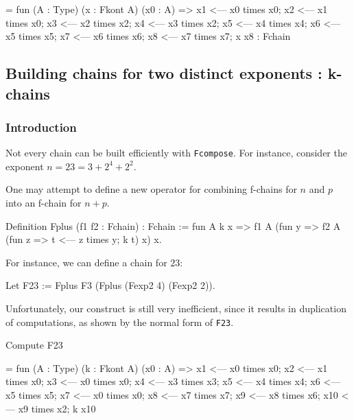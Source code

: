 \begin{Coqanswer}
= fun (A : Type) (x : Fkont A) (x0 : A) =>
       x1 <--- x0 times x0;
       x2 <--- x1 times x0;
       x3 <--- x2 times x2;
       x4 <--- x3 times x2;
       x5 <--- x4 times x4;
       x6 <--- x5 times x5; 
       x7 <--- x6 times x6; 
       x8 <--- x7 times x7; 
       x x8
     : Fchain  
\end{Coqanswer}



\subsection{Building chains for two distinct exponents : k-chains  \label{Kkonts-section}}

\subsubsection{Introduction}
Not every chain can be built efficiently  with \texttt{Fcompose}.
 For instance, consider the exponent $n= 23 = 3 + 2^4 + 2^2$. 

One may attempt to define a new operator  for combining f-chains for 
$n$ and $p$ into an f-chain for $n+p$.

\begin{Coqbad}
Definition Fplus (f1 f2 : Fchain) : Fchain :=
  fun A k x => 
   f1 A (fun y => 
            f2 A (fun z => t <--- z times y; k t) x) 
            x.
\end{Coqbad}

For instance, we can define a chain for $23$:

\begin{Coqbad}
Let F23 := Fplus F3 (Fplus (Fexp2 4) (Fexp2 2)).  
\end{Coqbad}

Unfortunately, our construct is still very inefficient, since it results in 
duplication of computations, as shown by the normal form of \texttt{F23}.

\begin{Coqbad}
Compute F23
\end{Coqbad}

\begin{Coqanswer}
 = fun (A : Type) (k : Fkont A) (x0 : A) =>
       x1 <--- x0 times x0;
       x2 <--- x1 times x0;
       x3 <--- x0 times x0;
       x4 <--- x3 times x3;
       x5 <--- x4 times x4;
       x6 <--- x5 times x5;
       x7 <--- x0 times x0;
       x8 <--- x7 times x7; 
       x9 <--- x8 times x6; 
       x10 <--- x9 times x2; 
       k x10
\end{Coqanswer}

